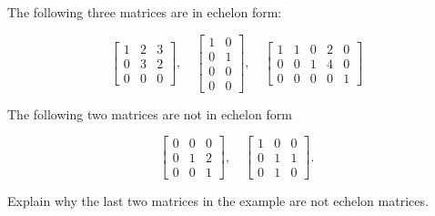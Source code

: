 \begin{ex}
\label{Ex:LinSystems:EchelonMatrices}
The following three matrices are in echelon form:

$$

 \left[
\begin{array}{rrr}1 & 2 & 3 \\ 0 & 3 & 2 \\ 0 & 0 & 0 \end{array}  \right], \quad
 \left[
\begin{array}{rr}1 & 0 \\ 0 & 1 \\ 0 & 0 \\ 0 & 0 \end{array}  \right], \quad
 \left[
\begin{array}{rrrrr}1 & 1 & 0 &  2 &  0\\ 0 & 0 & 1 & 4 & 0\\ 0 & 0 & 0 & 0 & 1\end{array}  \right]
$$

The following two matrices are not in echelon form

$$

 \left[
\begin{array}{rrr}0 & 0 & 0 \\ 0 & 1 & 2 \\ 0 & 0 & 1 \end{array}  \right], \quad
 \left[
\begin{array}{rrr}1 & 0 & 0 \\ 0 & 1 & 1  \\ 0 &1 & 0 \end{array}  \right].
$$

\end{ex}

\begin{exc}
\label{Exc:LinSystems:CheckNonEchelon}
Explain why the last two matrices in the example are not echelon matrices.
\end{exc}


